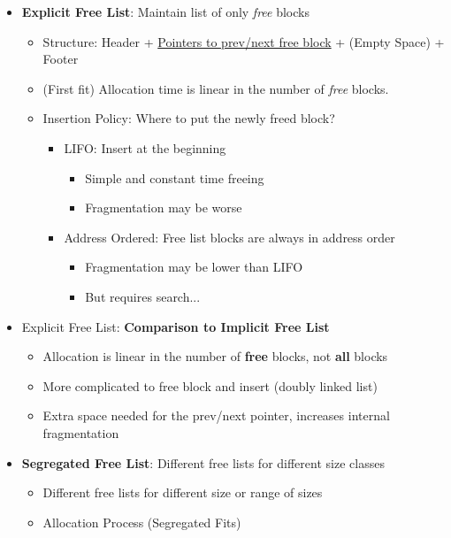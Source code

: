 \documentclass[12pt]{article}
\begin{document}
{\begin{itemize}
\begin{itemize}
		\item \textbf{Fix}. For allocated blocks, use the second LSB to contain allocation status of the previous block and remove footer. (Free blocks still need footer)
	\end{itemize}
	\item \textbf{Explicit Free List}: Maintain list of only \textit{free} blocks
	\begin{itemize}
		\item Structure: Header + \underline{Pointers to prev/next free block} + (Empty Space) + Footer
		\item (First fit) Allocation time is linear in the number of \textit{free} blocks.
		\item Insertion Policy: Where to put the newly freed block?
		\begin{itemize}
			\item LIFO: Insert at the beginning
			\begin{itemize}
				\item Simple and constant time freeing
				\item Fragmentation may be worse
			\end{itemize}
			\item Address Ordered: Free list blocks are always in address order
			\begin{itemize}
				\item Fragmentation may be lower than LIFO
				\item But requires search...
			\end{itemize}
		\end{itemize}
	\end{itemize}
	\item Explicit Free List: \textbf{Comparison to Implicit Free List}
	\begin{itemize}
		\item Allocation is linear in the number of \textbf{free} blocks, not \textbf{all} blocks
		\item More complicated to free block and insert (doubly linked list)
		\item Extra space needed for the prev/next pointer, increases internal fragmentation
	\end{itemize}
	\item \textbf{Segregated Free List}: Different free lists for different size classes
	\begin{itemize}
		\item Different free lists for different size or range of sizes
		\item Allocation Process (Segregated Fits)

\end{itemize}
\end{itemize}}
\end{document}

